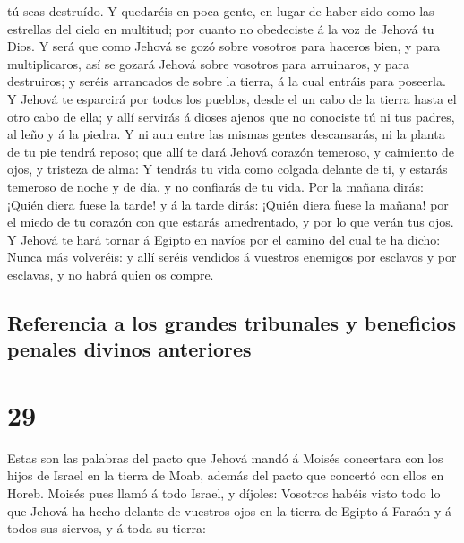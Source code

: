 tú seas destruído.  Y quedaréis en poca gente, en lugar
de haber sido como las estrellas del cielo en multitud; por cuanto no
obedeciste á la voz de Jehová tu Dios.  Y será que como
Jehová se gozó sobre vosotros para haceros bien, y para multiplicaros,
así se gozará Jehová sobre vosotros para arruinaros, y para destruiros;
y seréis arrancados de sobre la tierra, á la cual entráis para poseerla.
 Y Jehová te esparcirá por todos los pueblos, desde el un
cabo de la tierra hasta el otro cabo de ella; y allí servirás á dioses
ajenos que no conociste tú ni tus padres, al leño y á la piedra.
 Y ni aun entre las mismas gentes descansarás, ni la
planta de tu pie tendrá reposo; que allí te dará Jehová corazón
temeroso, y caimiento de ojos, y tristeza de alma:  Y
tendrás tu vida como colgada delante de ti, y estarás temeroso de noche
y de día, y no confiarás de tu vida.  Por la mañana
dirás: ¡Quién diera fuese la tarde! y á la tarde dirás: ¡Quién diera
fuese la mañana! por el miedo de tu corazón con que estarás amedrentado,
y por lo que verán tus ojos.  Y Jehová te hará tornar á
Egipto en navíos por el camino del cual te ha dicho: Nunca más
volveréis: y allí seréis vendidos á vuestros enemigos por esclavos y por
esclavas, y no habrá quien os compre.

\hypertarget{referencia-a-los-grandes-tribunales-y-beneficios-penales-divinos-anteriores}{%
\subsection{Referencia a los grandes tribunales y beneficios penales
divinos
anteriores}\label{referencia-a-los-grandes-tribunales-y-beneficios-penales-divinos-anteriores}}

\hypertarget{section-28}{%
\section{29}\label{section-28}}

 Estas son las palabras del pacto que Jehová mandó á
Moisés concertara con los hijos de Israel en la tierra de Moab, además
del pacto que concertó con ellos en Horeb.  Moisés pues
llamó á todo Israel, y díjoles: Vosotros habéis visto todo lo que Jehová
ha hecho delante de vuestros ojos en la tierra de Egipto á Faraón y á
todos sus siervos, y á toda su tierra:

